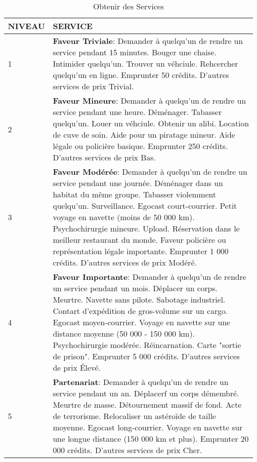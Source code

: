 \begin{table} \caption{Obtenir des Services} \begin{tabularx}{\textwidth}{|l|X|} \hline

NIVEAU &SERVICE \\ \hline

1 &\textbf{Faveur Triviale}: Demander à quelqu'un de rendre un service pendant 15 minutes. Bouger une chaise. Intimider quelqu'un. Trouver un véhciule. Rehcercher quelqu'un en ligne. Emprunter 50 crédits. D'autres services de prix Trivial. \\ \hline

2 &\textbf{Faveur Mineure}: Demander à quelqu'un de rendre un service pendant une heure. Déménager. Tabasser quelqu'un. Louer un véhciule. Obtenir un alibi. Location de cuve de soin. Aide pour un piratage mineur. Aide légale ou policière basique. Emprunter 250 crédits. D'autres services de prix Bas. \\ \hline

3 &\textbf{Faveur Modérée}: Demander à quelqu'un de rendre un service pendant une journée. Déménager dans un habitat du même groupe. Tabasser violemment quelqu'un. Surveillance. Egocast court-courrier. Petit voyage en navette (moins de 50 000 km). Psychochirurgie mineure. Upload. Réservation dans le meilleur restaurant du monde. Faveur policière ou représentation légale importante. Emprunter 1 000 crédits. D'autres services de prix Modéré. \\ \hline

4 &\textbf{Faveur Importante}: Demander à quelqu'un de rendre un service pendant un mois. Déplacer un corps. Meurtre. Navette sans pilote. Sabotage industriel. Contart d'expédition de gros-volume sur un cargo. Egocast moyen-courrier. Voyage en navette sur une distance moyenne (50 000 - 150 000 km). Psychochirurgie modérée. Réincarnation. Carte "sortie de prison". Emprunter 5 000 crédits. D'autres services de prix Élevé. \\ \hline

5 &\textbf{Partenariat}: Demander à quelqu'un de rendre un service pendant un an. Déplacerf un corps démembré. Meurtre de masse. Détournement massif de fond. Acte de terrorisme. Relocaliser un astéroïde de taille moyenne. Egocast long-courrier. Voyage en navette sur une longue distance (150 000 km et plus). Emprunter 20 000 crédits. D'autres services de prix Cher. \\ \hline

\end{tabularx} \end{table} 





